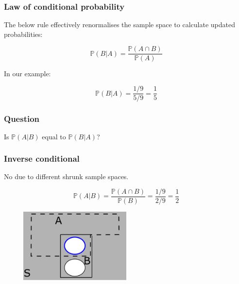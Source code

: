 \documentclass{beamer}
\begin{document}
	\begin{frame}
		\frametitle{Law of conditional probability}
		
		The below rule effectively renormalises the sample space to calculate updated probabilities:
		
		\begin{equation}
			\mathbb{P}(B|A) = \frac{\mathbb{P}(A \cap B)}{\mathbb{P}(A)}
		\end{equation}
	
		In our example:
		
		\begin{equation}
			\mathbb{P}(B|A) = \frac{1/9}{5/9} = \frac{1}{5}
		\end{equation}
		
	\end{frame}


	\begin{frame}
		\frametitle{Question}
		
		Is $\mathbb{P}(A|B)$ equal to $\mathbb{P}(B|A)$?
		
	\end{frame}

	\begin{frame}
		\frametitle{Inverse conditional}
		
		No due to different shrunk sample spaces.
			
		\begin{equation}
			\mathbb{P}(A|B) = \frac{\mathbb{P}(A \cap B)}{\mathbb{P}(B)} = \frac{1/9}{2/9} = \frac{1}{2}
		\end{equation}
			
		\begin{figure}[ht]
			\centerline{\includegraphics[width=0.5\textwidth]{./figures/pebble_world_conditional1.pdf}}
		\end{figure}
			
	\end{frame}
\end{document}
